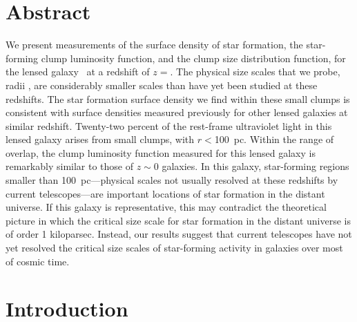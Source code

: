 


\section{Abstract}
We present measurements of the surface density of star formation, 
the star-forming clump luminosity function, and the clump size distribution function, 
for the lensed galaxy \giantarc\ at a redshift of $z=$\zA .
The physical size scales that we probe, radii \rangeofscales, 
are considerably smaller scales  than have yet been studied at these redshifts.  
The star formation surface density we find within these small clumps is consistent with
surface densities measured previously for other lensed galaxies at similar redshift.  
Twenty-two percent of the rest-frame ultraviolet light in this lensed galaxy arises
from small clumps,  with $r<$100~pc. 
Within the range of overlap, the clump luminosity function  measured for this 
lensed galaxy is remarkably similar to those of $z\sim0$ galaxies.  
In this galaxy, star-forming regions smaller than 100~pc---physical scales not 
usually resolved  at these redshifts by current  telescopes---are important locations 
of star formation in the distant universe.  If this galaxy is representative, 
this may contradict the theoretical picture in which the critical size scale for star
formation in the distant universe is of order 1 kiloparsec.
Instead, our results suggest that current telescopes have not yet resolved the critical size scales of star-forming activity 
in galaxies over most of cosmic time.  

\section{Introduction}\label{sec:intro}

